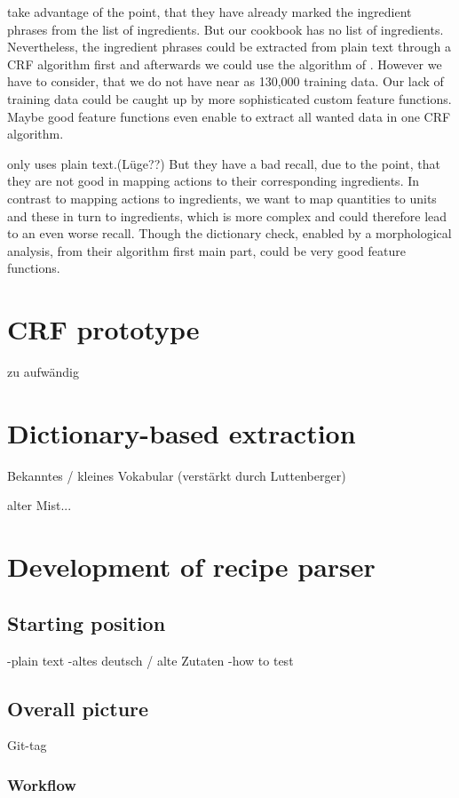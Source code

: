 \documentclass[12pt, twoside]{report}
\begin{document}
\parencite{CRFZeit} take advantage of the point, that they have already marked the ingredient phrases from the list of ingredients. But our cookbook has no list of ingredients. Nevertheless, the ingredient phrases could be extracted from plain text through a CRF algorithm first and afterwards we could use the algorithm of \parencite{CRFZeit}. However we have to consider, that we do not have near as 130,000 training data. Our lack of training data could be caught up by more sophisticated custom feature functions. Maybe good feature functions even enable to extract all wanted data in one CRF algorithm.

\parencite{GrammaBased} only uses plain text.(Lüge??) But they have a bad recall, due to the point, that they are not good in mapping actions to their corresponding ingredients. 
In contrast to mapping actions to ingredients, we want to map quantities to units and these in turn to ingredients, which is more complex and could therefore lead to an even worse recall. Though the dictionary check, enabled by a morphological analysis, from their algorithm first main part, could be very good feature functions.


\chapter{CRF prototype}
zu aufwändig

\chapter{Dictionary-based extraction}
Bekanntes / kleines Vokabular (verstärkt durch Luttenberger)

alter Mist...
\chapter{Development of recipe parser}

\section{Starting position}
-plain text
-altes deutsch / alte Zutaten
-how to test

\section{Overall picture}
Git-tag
\subsection{Workflow}
\end{document}
